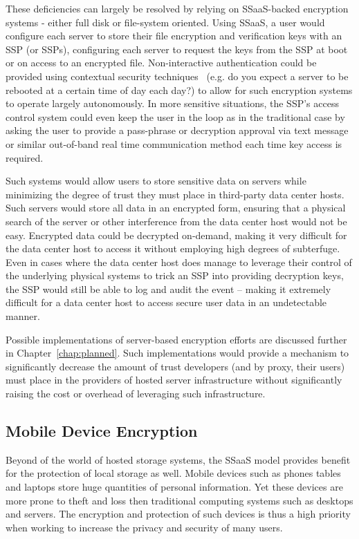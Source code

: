 These deficiencies can largely be resolved by relying on SSaaS-backed
encryption systems - either full disk or file-system oriented. Using
SSaaS, a user would configure each server to store their file
encryption and verification keys with an SSP (or SSPs), configuring
each server to request the keys from the SSP at boot or on access to
an encrypted file. Non-interactive authentication could be provided
using contextual security techniques~\cite{hulsebosch2005} (e.g. do
you expect a server to be rebooted at a certain time of day each day?)
to allow for such encryption systems to operate largely
autonomously. In more sensitive situations, the SSP's access control
system could even keep the user in the loop as in the traditional case
by asking the user to provide a pass-phrase or decryption approval via
text message or similar out-of-band real time communication method
each time key access is required.

Such systems would allow users to store sensitive data on servers
while minimizing the degree of trust they must place in third-party
data center hosts. Such servers would store all data in an encrypted
form, ensuring that a physical search of the server or other
interference from the data center host would not be easy. Encrypted
data could be decrypted on-demand, making it very difficult for the
data center host to access it without employing high degrees of
subterfuge. Even in cases where the data center host does manage to
leverage their control of the underlying physical systems to trick an
SSP into providing decryption keys, the SSP would still be able to log
and audit the event -- making it extremely difficult for a data center
host to access secure user data in an undetectable manner.

Possible implementations of server-based encryption efforts are
discussed further in Chapter~\ref{chap:planned}. Such implementations
would provide a mechanism to significantly decrease the amount of
trust developers (and by proxy, their users) must place in the
providers of hosted server infrastructure without significantly
raising the cost or overhead of leveraging such infrastructure.

\subsection{Mobile Device Encryption}

Beyond of the world of hosted storage systems, the SSaaS model
provides benefit for the protection of local storage as well. Mobile
devices such as phones tables and laptops store huge quantities of
personal information. Yet these devices are more prone to theft and
loss then traditional computing systems such as desktops and
servers. The encryption and protection of such devices is thus a high
priority when working to increase the privacy and security of many
users.

